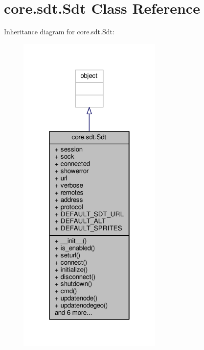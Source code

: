 \hypertarget{classcore_1_1sdt_1_1_sdt}{\section{core.\+sdt.\+Sdt Class Reference}
\label{classcore_1_1sdt_1_1_sdt}
}


Inheritance diagram for core.\+sdt.\+Sdt\+:
\nopagebreak
\begin{figure}[H]
\begin{center}
\leavevmode
\includegraphics[width=202pt]{classcore_1_1sdt_1_1_sdt__inherit__graph}
\end{center}
\end{figure}


